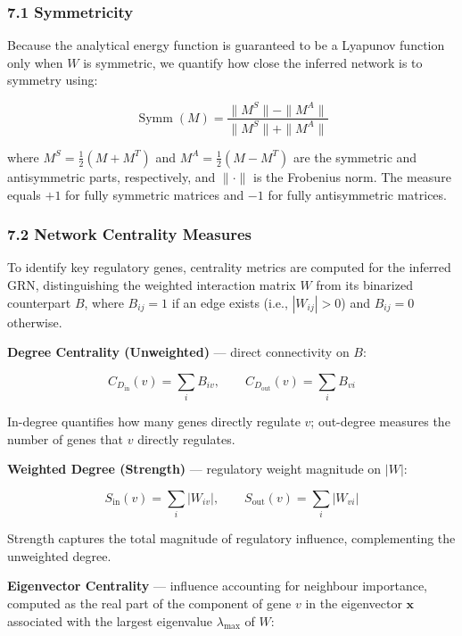 \documentclass[11pt]{article}
\begin{document}
\subsubsection*{7.1 Symmetricity}

Because the analytical energy function is guaranteed to be a Lyapunov function only when $W$ is symmetric, we quantify how close the inferred network is to symmetry using:


\begin{equation}
\operatorname{Symm}(M) = \frac{\|M^S\| - \|M^A\|}{\|M^S\| + \|M^A\|} 
\end{equation}


where $M^S = \frac{1}{2}(M + M^T)$ and $M^A = \frac{1}{2}(M - M^T)$ are the symmetric and antisymmetric parts, respectively, and $\|\cdot\|$ is the Frobenius norm. The measure equals $+1$ for fully symmetric matrices and $-1$ for fully antisymmetric matrices.


\subsubsection*{7.2 Network Centrality Measures}

To identify key regulatory genes, centrality metrics are computed for the inferred GRN, distinguishing the weighted interaction matrix $W$ from its binarized counterpart $B$, where $B_{ij} = 1$ if an edge exists (i.e., $|W_{ij}| > 0$) and $B_{ij} = 0$ otherwise.

\textbf{Degree Centrality (Unweighted)} — direct connectivity on $B$:

\begin{equation}
C_{D_{\text{in}}}(v) = \sum_i B_{iv}, \qquad C_{D_{\text{out}}}(v) = \sum_i B_{vi} 
\end{equation}


In-degree quantifies how many genes directly regulate $v$; out-degree measures the number of genes that $v$ directly regulates.

\textbf{Weighted Degree (Strength)} — regulatory weight magnitude on $|W|$:

\begin{equation}
S_{\text{in}}(v) = \sum_i |W_{iv}|, \qquad S_{\text{out}}(v) = \sum_i |W_{vi}| 
\end{equation}


Strength captures the total magnitude of regulatory influence, complementing the unweighted degree.

\textbf{Eigenvector Centrality} — influence accounting for neighbour importance, computed as the real part of the component of gene $v$ in the eigenvector $\mathbf{x}$ associated with the largest eigenvalue $\lambda_{\max}$ of $W$:
\end{document}
